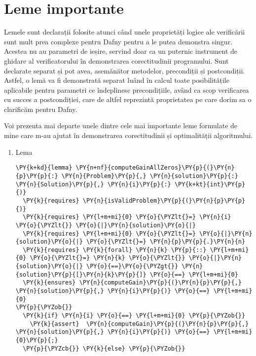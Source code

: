 \chapter{Leme importante}
\begin{sloppypar}

Lemele sunt declarații folosite atunci când unele proprietăți logice ale verificării sunt mult prea complexe pentru Dafny pentru a le putea demonstra singur. Acestea nu au parametri de ieșire, servind doar ca un puternic instrument de ghidare al verificatorului în demonstrarea corectitudinii programului. Sunt declarate separat și pot avea, asemănător metodelor, precondiții și postcondiții. Astfel, o lemă va fi demonstrată separat luând în calcul toate posibilitățile aplicabile pentru parametri ce îndeplinesc precondițiile, având ca scop verificarea cu succes a postcondiției, care de altfel reprezintă proprietatea pe care dorim sa o clarificăm pentru Dafny. \par
Voi prezenta mai departe unele dintre cele mai importante leme formulate de mine care m-au ajutat în demonstrarea corectitudinii și optimalității algoritmului. \par
\begin{enumerate}
    \item Lema  
    \begin{Verbatim}[commandchars=\\\{\}]
\PY{k+kd}{lemma} \PY{n+nf}{computeGainAllZeros}\PY{p}{(}\PY{n}{p}\PY{p}{:} \PY{n}{Problem}\PY{p}{,} \PY{n}{solution}\PY{p}{:} \PY{n}{Solution}\PY{p}{,} \PY{n}{i}\PY{p}{:} \PY{k+kt}{int}\PY{p}{)}
  \PY{k}{requires} \PY{n}{isValidProblem}\PY{p}{(}\PY{n}{p}\PY{p}{)}
  \PY{k}{requires} \PY{l+m+mi}{0} \PY{o}{\PYZlt{}=} \PY{n}{i} \PY{o}{\PYZlt{}} \PY{o}{|}\PY{n}{solution}\PY{o}{|}
  \PY{k}{requires} \PY{l+m+mi}{0} \PY{o}{\PYZlt{}=} \PY{o}{|}\PY{n}{solution}\PY{o}{|} \PY{o}{\PYZlt{}=} \PY{n}{p}\PY{p}{.}\PY{n}{n} 
  \PY{k}{requires} \PY{k}{forall} \PY{n}{k} \PY{p}{::} \PY{l+m+mi}{0} \PY{o}{\PYZlt{}=} \PY{n}{k} \PY{o}{\PYZlt{}} \PY{o}{|}\PY{n}{solution}\PY{o}{|} \PY{o}{==}\PY{o}{\PYZgt{}} \PY{n}{solution}\PY{p}{[}\PY{n}{k}\PY{p}{]} \PY{o}{==} \PY{l+m+mi}{0}
  \PY{k}{ensures} \PY{n}{computeGain}\PY{p}{(}\PY{n}{p}\PY{p}{,} \PY{n}{solution}\PY{p}{,} \PY{n}{i}\PY{p}{)} \PY{o}{==} \PY{l+m+mi}{0}
\PY{p}{\PYZob{}}
  \PY{k}{if} \PY{n}{i} \PY{o}{==} \PY{l+m+mi}{0} \PY{p}{\PYZob{}}
    \PY{k}{assert}  \PY{n}{computeGain}\PY{p}{(}\PY{n}{p}\PY{p}{,} \PY{n}{solution}\PY{p}{,} \PY{n}{i}\PY{p}{)} \PY{o}{==} \PY{l+m+mi}{0}\PY{p}{;}
  \PY{p}{\PYZcb{}} \PY{k}{else} \PY{p}{\PYZob{}}

\end{Verbatim}
\end{enumerate}
\end{sloppypar}
